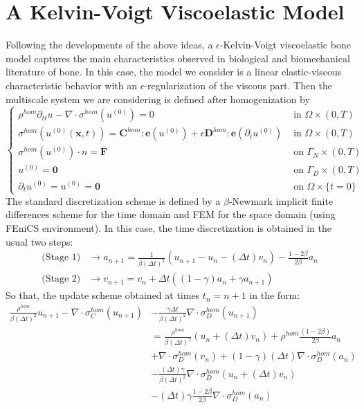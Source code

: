 \section{A Kelvin-Voigt Viscoelastic Model}
Following the developments of the above ideas, a $\epsilon$-Kelvin-Voigt viscoelastic bone model captures the main characteristics observed in biological and biomechanical literature of bone. In this case, the model we consider is a linear elastic-viscous characteristic behavior with an $\epsilon$-regularization of the viscous part.
Then the multiscale system we are considering is defined after homogenization by
\begin{equation*}
    \left \{
    \begin{array}{cc}
        \rho^{hom} \partial_{tt} u - \nabla \cdot \sigma^{hom}(u^{(0)}) = 0 & \text{ in } \Omega \times (0,T) \\
        \sigma^{hom}(u^{(0)}(\mathbf{x},t)) =  \mathbf{C}^{hom}:\mathbf{e}(u^{(0)}) + \epsilon \mathbf{D}^{hom}:\mathbf{e}(\partial_{t}u^{(0)}) & \text{ in }\Omega \times (0,T)\\
        \sigma^{hom}(u^{(0)})\cdot n = \mathbf{F} & \text{ on }\Gamma_N\times (0,T) \\
        u^{(0)} = \mathbf{0} & \text{ on }\Gamma_D \times (0,T) \\
    \partial_t u^{(0)} = u^{(0)} = \mathbf{0} &  \text{ on } \Omega \times \{t=0\}
    \end{array}
    \right .
\end{equation*}
The standard discretization scheme is defined by a $\beta$-Newmark implicit finite differences scheme for the time domain and FEM for the space domain (using FEniCS environment). In this case, the time discretization is obtained in the usual two steps:
\begin{align*}
    \text{(Stage 1)} &\longrightarrow a_{n+1} = \frac{1}{\beta (\Delta t)^2} (u_{n+1}-u_{n}-(\Delta t)v_n) - \frac{1-2\beta}{2\beta}a_n\\
    \text{(Stage 2)}& \longrightarrow v_{n+1} = v_n + \Delta t((1-\gamma)a_n + \gamma a_{n+1})
\end{align*}
So that, the update scheme obtained at times $t_n = n+1$ in the form:
\begin{align*}
    \frac{\rho^{hom}}{\beta (\Delta t)^2} u_{n+1} - \nabla \cdot \sigma_C^{hom}( u_{n+1})  & - \frac{\gamma \Delta t}{\beta (\Delta t)^2} \nabla \cdot \sigma_D^{hom}(u_{n+1}) \\
    &= \frac{\rho^{hom}}{\beta (\Delta t)^2} (u_n + (\Delta t)v_n) + \rho^{hom}\frac{ (1-2\beta)}{2\beta} a_n \\
    & + \nabla \cdot \sigma_D^{hom}(v_n) + (1-\gamma)(\Delta t) \nabla\cdot \sigma_D^{hom}(a_n) \\
    & - \frac{(\Delta t)\gamma}{\beta (\Delta t)^2}\nabla \cdot \sigma_D^{hom}(u_n + (\Delta t)v_n) \\
    & - (\Delta t)\gamma\frac{1-2\beta}{2 \beta} \nabla \cdot \sigma_D^{hom}(a_n)
\end{align*}

